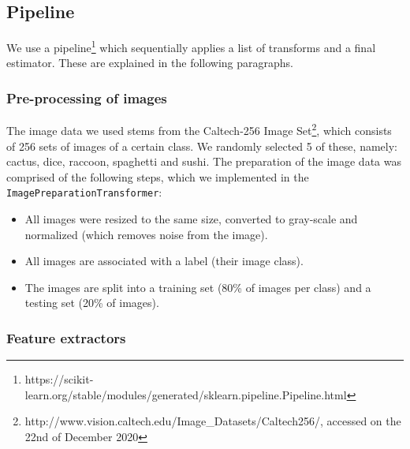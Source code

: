 \documentclass{scrartcl}
\begin{document}
\subsection{Pipeline}
We use a pipeline\footnote{https://scikit-learn.org/stable/modules/generated/sklearn.pipeline.Pipeline.html} which sequentially applies a list of transforms and a final estimator. These are explained in the following paragraphs.

\subsubsection{Pre-processing of images}
The image data we used stems from the Caltech-256 Image Set\footnote{http://www.vision.caltech.edu/Image\_Datasets/Caltech256/, accessed on the 22nd of December 2020}, which consists of 256 sets of images of a certain class. We randomly selected 5 of these, namely: cactus, dice, raccoon, spaghetti and sushi. The preparation of the image data was comprised of the following steps, which we implemented in the \texttt{ImagePreparationTransformer}:
\begin{itemize}
  \item All images were resized to the same size, converted to gray-scale and normalized (which removes noise from the image).
  \item All images are associated with a label (their image class).
  \item The images are split into a training set (80\% of images per class) and a testing set (20\% of images).
\end{itemize}

\subsubsection{Feature extractors}
\end{document}
